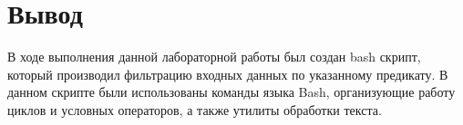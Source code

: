 \documentclass[a4paper,14pt]{extarticle}
\begin{document}
\newpage

\section*{Вывод}
В ходе выполнения данной лабораторной работы был создан bash скрипт, который производил фильтрацию входных данных по указанному предикату. В данном скрипте были использованы команды языка Bash, организующие работу циклов и условных операторов, а также утилиты обработки текста.
\end{document}
